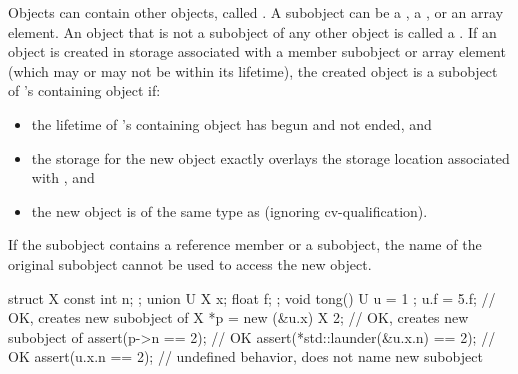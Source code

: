 \pnum
{}%
Objects can contain other objects, called .
A subobject can be
a , a ,
or an array element.
%
An object that is not a subobject of any other object is called a .
If an object is created
in storage associated with a member subobject or array element 
(which may or may not be within its lifetime),
the created object
is a subobject of 's containing object if:
\begin{itemize}
\item
the lifetime of 's containing object has begun and not ended, and
\item
the storage for the new object exactly overlays the storage location associated with , and
\item
the new object is of the same type as  (ignoring cv-qualification).
\end{itemize}
\begin{note}
If the subobject contains a reference member or a  subobject,
the name of the original subobject cannot be used to access the new object.
\end{note}
\begin{example}
\begin{codeblock}
struct X { const int n; };
union U { X x; float f; };
void tong() {
  U u = {{ 1 }};
  u.f = 5.f;                          // OK, creates new subobject of 
  X *p = new (&u.x) X {2};            // OK, creates new subobject of 
  assert(p->n == 2);                  // OK
  assert(*std::launder(&u.x.n) == 2); // OK
  assert(u.x.n == 2);                 // undefined behavior,  does not name new subobject
}
\end{codeblock}
\end{example}

